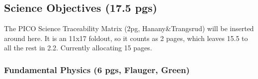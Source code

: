 \documentclass[12pt]{article}
\begin{document}



\vspace{-0.18in}

\subsection{Science Objectives (17.5 pgs) } 

\vspace{-0.05in}

  The PICO Science Traceability Matrix (2pg, Hanany\&Trangsrud) will be inserted around here.  It is an 11x17 foldout, so it counts as 2 pages, which leaves 15.5 to all the rest in 2.2. Currently allocating 15 pages.  
    

\vspace{-0.18in}

\subsubsection{Fundamental Physics (6 pgs, Flauger, Green)}
\end{document}

